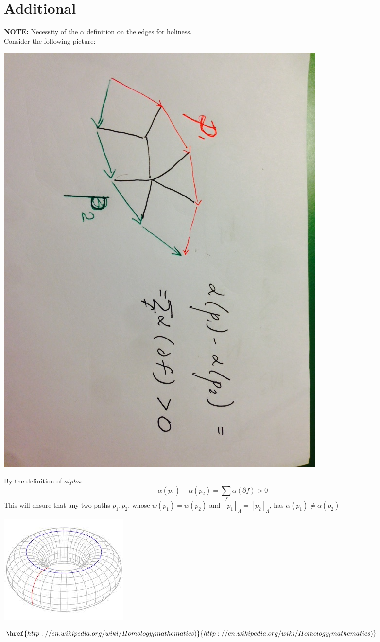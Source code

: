 \documentclass{article}
\begin{document}
\section{Additional}
\textbf{NOTE: } Necessity of the $\alpha$ definition on the edges for holiness.  
\\
Consider the following picture:
\begin{center}
\includegraphics[angle = 90, scale = 0.3]{alphaNec.jpg}
\end{center}
By the definition of $alpha$:
\[\alpha(p_1) - \alpha(p_2) = \sum_f \alpha(\partial f) > 0\]
This will ensure that any two paths $p_1, p_2$, whose $w(p_1) = w(p_2)$ and 
  $[p_1]_{\Lambda} = [p_2]_{\Lambda}$, has $\alpha(p_1) \neq \alpha(p_2)$

\begin{center}
\includegraphics{torus.jpg}
\end{center}
$\href{http://en.wikipedia.org/wiki/Homology_(mathematics)}{http://en.wikipedia.org/wiki/Homology_(mathematics)}$
\end{document}
